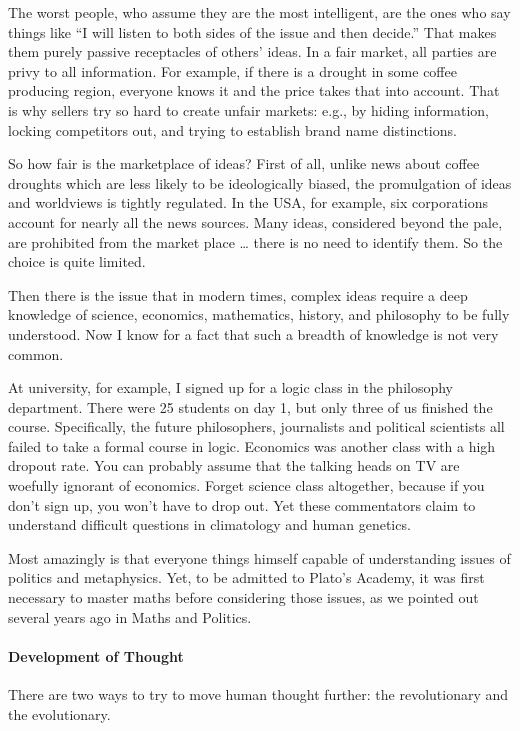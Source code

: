 The worst people, who assume they are the most intelligent, are the ones who say things like “I will listen to both sides of the issue and then decide.” That makes them purely passive receptacles of others’ ideas. In a fair market, all parties are privy to all information. For example, if there is a drought in some coffee producing region, everyone knows it and the price takes that into account. That is why sellers try so hard to create unfair markets: e.g., by hiding information, locking competitors out, and trying to establish brand name distinctions.

So how fair is the marketplace of ideas? First of all, unlike news about coffee droughts which are less likely to be ideologically biased, the promulgation of ideas and worldviews is tightly regulated. In the USA, for example, six corporations account for nearly all the news sources. Many ideas, considered beyond the pale, are prohibited from the market place … there is no need to identify them. So the choice is quite limited.

Then there is the issue that in modern times, complex ideas require a deep knowledge of science, economics, mathematics, history, and philosophy to be fully understood. Now I know for a fact that such a breadth of knowledge is not very common.

At university, for example, I signed up for a logic class in the philosophy department. There were 25 students on day 1, but only three of us finished the course. Specifically, the future philosophers, journalists and political scientists all failed to take a formal course in logic. Economics was another class with a high dropout rate. You can probably assume that the talking heads on TV are woefully ignorant of economics. Forget science class altogether, because if you don't sign up, you won't have to drop out. Yet these commentators claim to understand difficult questions in climatology and human genetics.

Most amazingly is that everyone things himself capable of understanding issues of politics and metaphysics. Yet, to be admitted to Plato's Academy, it was first necessary to master maths before considering those issues, as we pointed out several years ago in Maths and Politics.

\paragraph{Development of Thought}
There are two ways to try to move human thought further: the revolutionary and the evolutionary.

